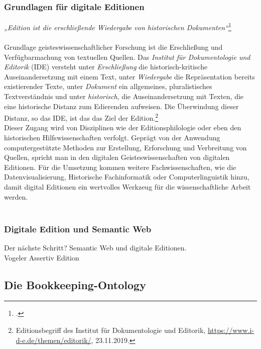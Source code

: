 \documentclass[12pt,a4paper]{article}
\begin{document}
\subsubsection{Grundlagen für digitale Editionen}

\textit{„Edition ist die erschließende Wiedergabe von historischen Dokumenten“}\footcite[][S.76]{sahle2003edition}
\\
\\
Grundlage geisteswissenschaftlicher Forschung ist die Erschließung und Verfügbarmachung von textuellen Quellen. Das \textit{Institut für Dokumentologie und Editorik} (IDE) versteht unter \textit{Erschließung} die historisch-kritische Auseinandersetzung mit einem Text, unter \textit{Wiedergabe} die Repräsentation bereits existierender Texte, unter \textit{Dokument} ein allgemeines, pluralistisches Textverständnis und unter \textit{historisch}, die Auseinandersetzung mit Texten, die eine historische Distanz zum Edierenden aufweisen. Die Überwindung dieser Distanz, so das IDE, ist das das Ziel der Edition.\footnote{Editionsbegriff des Institut für Dokumentologie und Editorik, \url{https://www.i-d-e.de/themen/editorik/}, 23.11.2019.}
\\
Dieser Zugang wird von Disziplinen wie der Editionsphilologie oder eben den historischen Hilfswissenschaften verfolgt. Geprägt von der Anwendung computergestützte Methoden zur Erstellung, Erforschung und Verbreitung von Quellen, spricht man in den digitalen Geisteswissenschaften von digitalen Editionen. Für die Umsetzung kommen weitere Fachwissenschaften, wie die Datenvisualisierung, Historische Fachinformatik oder Computerlinguistik hinzu, damit digital Editionen ein wertvolles Werkzeug für die wissenschaftliche Arbeit werden.
\\
\\


\subsubsection{Digitale Edition und Semantic Web}

Der nächste Schritt? Semantic Web und digitale Editionen.
\\
Vogeler Assertiv Edition


\subsection{Die Bookkeeping-Ontology}
\label{BK}
\end{document}
